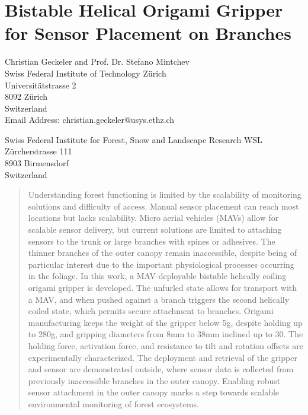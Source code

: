 \chapter{Bistable Helical Origami Gripper for Sensor Placement on Branches}
\label{ch:origami_gripper}

\author{Christian Geckeler*}
\author{Stefano Mintchev}

\begin{affiliations}
\noindent
Christian Geckeler and Prof. Dr. Stefano Mintchev\\
Swiss Federal Institute of Technology Zürich\\
Universitätstrasse 2\\
8092 Zürich\\
Switzerland\\
Email Address: christian.geckeler@usys.ethz.ch\\ %
\par

\noindent
Swiss Federal Institute for Forest, Snow and Landscape Research WSL\\
Zürcherstrasse 111\\
8903 Birmensdorf\\
Switzerland
\end{affiliations}


\begin{abstract} %
Understanding forest functioning is limited by the scalability of monitoring solutions and difficulty of access. Manual sensor placement can reach most locations but lacks scalability. Micro aerial vehicles (MAVs) allow for scalable sensor delivery, but current solutions are limited to attaching sensors to the trunk or large branches with spines or adhesives. The thinner branches of the outer canopy remain inaccessible, despite being of particular interest due to the important physiological processes occurring in the foliage. In this work, a MAV-deployable bistable helically coiling origami gripper is developed. The unfurled state allows for transport with a MAV, and when pushed against a branch triggers the second helically coiled state, which permits secure attachment to branches. Origami manufacturing keeps the weight of the gripper below 5g, despite holding up to 280g, and gripping diameters from 8mm to 38mm inclined up to 30\degree. The holding force, activation force, and resistance to tilt and rotation offsets are experimentally characterized. The deployment and retrieval of the gripper and sensor are demonstrated outside, where sensor data is collected from previously inaccessible branches in the outer canopy. Enabling robust sensor attachment in the outer canopy marks a step towards scalable environmental monitoring of forest ecosystems.
\end{abstract}


